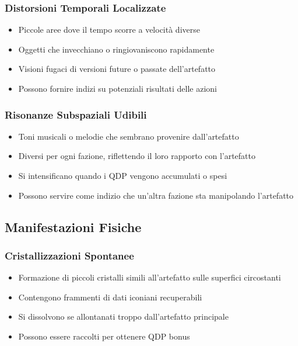 \documentclass[letterpaper,twocolumn,openany,nodeprecatedcode]{dndbook}
\begin{document}
\subsubsection{Distorsioni Temporali Localizzate}
   \begin{itemize}
       \item Piccole aree dove il tempo scorre a velocità diverse
       \item Oggetti che invecchiano o ringiovaniscono rapidamente
       \item Visioni fugaci di versioni future o passate dell'artefatto
       \item Possono fornire indizi su potenziali risultati delle azioni
   \end{itemize}

\subsubsection{Risonanze Subspaziali Udibili}
   \begin{itemize}
       \item Toni musicali o melodie che sembrano provenire dall'artefatto
       \item Diversi per ogni fazione, riflettendo il loro rapporto con l'artefatto
       \item Si intensificano quando i QDP vengono accumulati o spesi
       \item Possono servire come indizio che un'altra fazione sta manipolando l'artefatto
   \end{itemize}

\subsection{Manifestazioni Fisiche}

\subsubsection{Cristallizzazioni Spontanee}
   \begin{itemize}
       \item Formazione di piccoli cristalli simili all'artefatto sulle superfici circostanti
       \item Contengono frammenti di dati iconiani recuperabili
       \item Si dissolvono se allontanati troppo dall'artefatto principale
       \item Possono essere raccolti per ottenere QDP bonus
   \end{itemize}
\end{document}
